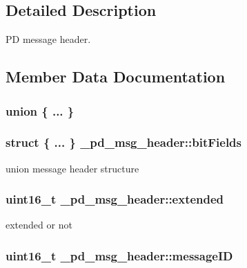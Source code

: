 \subsection{Detailed Description}
P\-D message header. 

\subsection{Member Data Documentation}
\hypertarget{struct__pd__msg__header_aef15a7651ceb3891522886252d8ce9f8}{\subsubsection[{"@50}]{\setlength{\rightskip}{0pt plus 5cm}union \{ ... \} }}\label{struct__pd__msg__header_aef15a7651ceb3891522886252d8ce9f8}
\hypertarget{struct__pd__msg__header_a6dc4609c23d8d9e5d8830177d959fe17}{
\subsubsection[{bit\-Fields}]{\setlength{\rightskip}{0pt plus 5cm}struct \{ ... \}   \-\_\-pd\-\_\-msg\-\_\-header\-::bit\-Fields}}\label{struct__pd__msg__header_a6dc4609c23d8d9e5d8830177d959fe17}
union message header structure \hypertarget{struct__pd__msg__header_a29b5707169e4c8d770aa0a80aecc77c5}{
\subsubsection[{extended}]{\setlength{\rightskip}{0pt plus 5cm}uint16\-\_\-t \-\_\-pd\-\_\-msg\-\_\-header\-::extended}}\label{struct__pd__msg__header_a29b5707169e4c8d770aa0a80aecc77c5}
extended or not \hypertarget{struct__pd__msg__header_a2007d25305ee31d9ab6aa01ee6025255}{
\subsubsection[{message\-I\-D}]{\setlength{\rightskip}{0pt plus 5cm}uint16\-\_\-t \-\_\-pd\-\_\-msg\-\_\-header\-::message\-I\-D}}\label{struct__pd__msg__header_a2007d25305ee31d9ab6aa01ee6025255}
